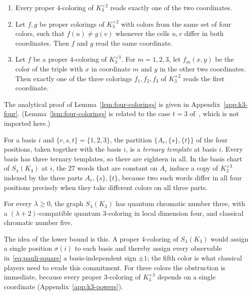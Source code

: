 \begin{lemma}\label{lem:four-colorings}
\leavevmode
\begin{enumerate}
\item[(a)] Every proper $4$-coloring of $K_3^{\times2}$ reads exactly one of the two coordinates.
\item[(b)] Let $f,g$ be proper colorings of $K_3^{\times2}$ with colors from the same set of four colors, such that $f(u)\ne g(v)$ whenever the cells $u,v$ differ in both coordinates. Then $f$ and $g$ read the same coordinate.
\item[(c)] Let $f$ be a proper $4$-coloring of $K_3^{\times3}$. For $m=1,2,3$, let $f_m(x,y)$ be the color of the triple with $x$ in coordinate $m$ and $y$ in the other two coordinates. Then exactly one of the three colorings $f_1,f_2,f_3$ of $K_3^{\times2}$ reads the first coordinate.
\end{enumerate}
\end{lemma}

The analytical proof of Lemma~\ref{lem:four-colorings} is given in Appendix~\ref{app:k3-four}. (Lemma~\ref{lem:four-colorings} is related to the case $t=3$ of~\cite[Lemma~3.7]{BG}, which is not imported here.)

For a basis $i$ and $\{r,s,t\}=\{1,2,3\}$, the partition $\{A_r,\{s\},\{t\}\}$ of the four positions, taken together with the basis $i$, is a \emph{ternary template} at basis $i$. Every basis has three ternary templates, so there are eighteen in all. In the basis chart of $S_\lambda(K_3)$ at $i$, the $27$ words that are constant on $A_r$ induce a copy of $K_3^{\times3}$ indexed by the three parts $A_r,\{s\},\{t\}$, because two such words differ in all four positions precisely when they take different colors on all three parts.

\begin{theorem}\label{thm:one-level}
For every $\lambda\ge0$, the graph $S_\lambda(K_3)$ has quantum chromatic number three, with a $(\lambda+2)$-compatible quantum $3$-coloring in local dimension four, and classical chromatic number five.
\end{theorem}

The idea of the lower bound is this. A proper $4$-coloring of $S_\lambda(K_3)$ would assign a single position $\sigma(i)$ to each basis and thereby assign every observable in~\eqref{eq:pauli-square} a basis-independent sign $\pm1$; the fifth color is what classical players need to evade this commitment. For three colors the obstruction is immediate, because every proper $3$-coloring of $K_3^{\times3}$ depends on a single coordinate (Appendix~\ref{app:k3-powers}).

